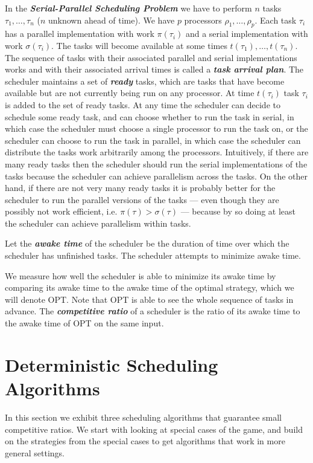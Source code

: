 \documentclass[twocolumn]{article}[10pt]
\newcommand{\defn}[1]{{\textit{\textbf{\boldmath #1}}}\xspace}
\begin{document}
In the \defn{Serial-Parallel Scheduling Problem} we have to
perform $n$ tasks $\tau_1, \ldots, \tau_n$ ($n$ unknown ahead of
time). We have $p$ processors $\rho_1, \ldots, \rho_p$. Each task
$\tau_i$ has a parallel implementation with work $\pi(\tau_i)$ and a
serial implementation with work $\sigma(\tau_i)$. The tasks will become
available at some times $t(\tau_1), \ldots, t(\tau_n)$. 
The sequence of tasks with their associated parallel and serial
implementations works and with their associated arrival times is
called a \defn{task arrival plan}.
The scheduler maintains a set of \defn{ready} tasks, which are tasks that have
become available but are not currently being run on any
processor. At time $t(\tau_i)$ task $\tau_i$ is added to the set of
ready tasks. At any time the scheduler can decide to schedule
some ready task, and can choose whether to run the task in
serial, in which case the scheduler must choose a single
processor to run the task on, or the scheduler can choose to run
the task in parallel, in which case the scheduler can distribute
the tasks work arbitrarily among the processors. Intuitively, if
there are many ready tasks then the scheduler should run the
serial implementations of the tasks because the scheduler can
achieve parallelism across the tasks. On the other hand, if there
are not very many ready tasks it is probably better for the
scheduler to run the parallel versions of the tasks --- even
though they are possibly not work efficient, i.e. $\pi(\tau) >
\sigma(\tau)$ --- because by so doing at least the scheduler can
achieve parallelism within tasks.

Let the \defn{awake time} of the scheduler be the duration of
time over which the scheduler has unfinished tasks.
The scheduler attempts to minimize awake time.

We measure how well the scheduler is able to minimize its awake
time by comparing its awake time to the awake time of the optimal
strategy, which we will denote OPT. Note that OPT is able to see
the whole sequence of tasks in advance.
The \defn{competitive ratio} of a scheduler is the ratio
of its awake time to the awake time of OPT on the same input.

\section{Deterministic Scheduling Algorithms}

In this section we exhibit three scheduling algorithms that
guarantee small competitive ratios. We start with looking at
special cases of the game, and build on the strategies from the
special cases to get algorithms that work in more general
settings.
\end{document}
